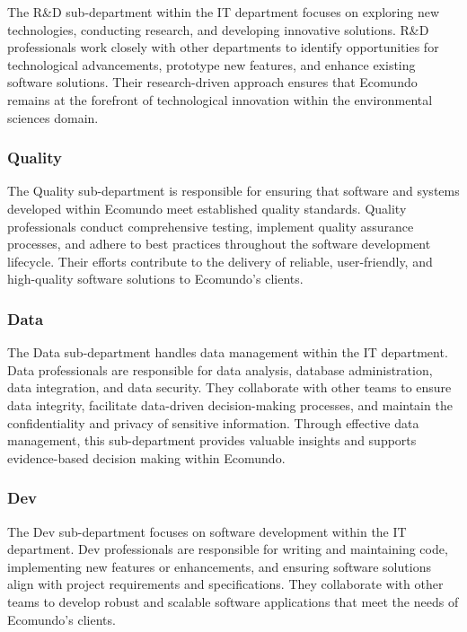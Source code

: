 \documentclass[a4paper,12pt,twoside]{report}
\begin{document}
The R\&D sub-department within the IT department focuses on exploring new technologies, conducting research, and developing innovative solutions. R\&D professionals work closely with other departments to identify opportunities for technological advancements, prototype new features, and enhance existing software solutions. Their research-driven approach ensures that Ecomundo remains at the forefront of technological innovation within the environmental sciences domain.

\subsubsection{Quality}

The Quality sub-department is responsible for ensuring that software and systems developed within Ecomundo meet established quality standards. Quality professionals conduct comprehensive testing, implement quality assurance processes, and adhere to best practices throughout the software development lifecycle. Their efforts contribute to the delivery of reliable, user-friendly, and high-quality software solutions to Ecomundo's clients.

\subsubsection{Data}

The Data sub-department handles data management within the IT department. Data professionals are responsible for data analysis, database administration, data integration, and data security. They collaborate with other teams to ensure data integrity, facilitate data-driven decision-making processes, and maintain the confidentiality and privacy of sensitive information. Through effective data management, this sub-department provides valuable insights and supports evidence-based decision making within Ecomundo.

\subsubsection{Dev}

The Dev sub-department focuses on software development within the IT department. Dev professionals are responsible for writing and maintaining code, implementing new features or enhancements, and ensuring software solutions align with project requirements and specifications. They collaborate with other teams to develop robust and scalable software applications that meet the needs of Ecomundo's clients.
\end{document}
